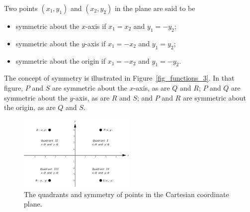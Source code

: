 \ifvc
\begin{definition}
Two points $(x_1,y_1)$ and $(x_2,y_2)$ in the plane are said to be
\vspace{-0.3cm}
\begin{itemize}
\item symmetric about the  $x$-axis if $x_1 = x_2$ and $y_1 = -y_2$;
\item symmetric about the $y$-axis if $x_1 = -x_2$ and $y_1 = y_2$;
\item symmetric about the origin if $x_1 = -x_2$ and $y_1 = -y_2$.
\end{itemize}
\end{definition}
The concept of symmetry is illustrated in Figure~\ref{fig_functions_3}. In that figure, $P$ and $S$ are symmetric about the $x$-axis, as are $Q$ and $R$;  $P$ and $Q$ are symmetric about the $y$-axis, as are $R$ and $S$;  and $P$ and $R$ are symmetric about the origin, as are $Q$ and $S$.

\begin{figure}[H]
	\begin{center}
			\includegraphics[width=0.5\textwidth]{fig_functions_2}
	\caption{The quadrants and symmetry of points in the Cartesian coordinate plane.}
	\label{fig_functions_2}
	\end{center}
\end{figure}

